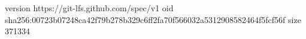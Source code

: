 version https://git-lfs.github.com/spec/v1
oid sha256:00723b07248ca42f79b278b329c6ff2fa70f566032a5312908582464f5fcf56f
size 371334
